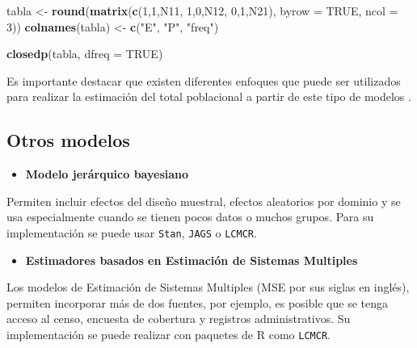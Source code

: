 \documentclass[
  12pt,
]{book}
\newenvironment{Shaded}{\begin{snugshade}}{\end{snugshade}}
\newcommand{\AttributeTok}[1]{\textcolor[rgb]{0.13,0.29,0.53}{#1}}
\newcommand{\ConstantTok}[1]{\textcolor[rgb]{0.56,0.35,0.01}{#1}}
\newcommand{\DecValTok}[1]{\textcolor[rgb]{0.00,0.00,0.81}{#1}}
\newcommand{\FunctionTok}[1]{\textcolor[rgb]{0.13,0.29,0.53}{\textbf{#1}}}
\newcommand{\NormalTok}[1]{#1}
\newcommand{\OtherTok}[1]{\textcolor[rgb]{0.56,0.35,0.01}{#1}}
\newcommand{\StringTok}[1]{\textcolor[rgb]{0.31,0.60,0.02}{#1}}
\providecommand{\tightlist}{%
  \setlength{\itemsep}{0pt}\setlength{\parskip}{0pt}}
\begin{document}
\begin{Shaded}
\begin{Highlighting}[]
\NormalTok{tabla }\OtherTok{\textless{}{-}} \FunctionTok{round}\NormalTok{(}\FunctionTok{matrix}\NormalTok{(}\FunctionTok{c}\NormalTok{(}\DecValTok{1}\NormalTok{,}\DecValTok{1}\NormalTok{,N11,}
                        \DecValTok{1}\NormalTok{,}\DecValTok{0}\NormalTok{,N12,}
                        \DecValTok{0}\NormalTok{,}\DecValTok{1}\NormalTok{,N21), }\AttributeTok{byrow =} \ConstantTok{TRUE}\NormalTok{, }\AttributeTok{ncol =} \DecValTok{3}\NormalTok{))}
\FunctionTok{colnames}\NormalTok{(tabla) }\OtherTok{\textless{}{-}} \FunctionTok{c}\NormalTok{(}\StringTok{"E"}\NormalTok{, }\StringTok{"P"}\NormalTok{, }\StringTok{"freq"}\NormalTok{)}

\FunctionTok{closedp}\NormalTok{(tabla, }\AttributeTok{dfreq =} \ConstantTok{TRUE}\NormalTok{)}
\end{Highlighting}
\end{Shaded}

Es importante destacar que existen diferentes enfoques que puede ser utilizados para realizar la estimación del total poblacional a partir de este tipo de modelos \citep{otis1978statistical, rivest2007applications, baillargeon2007rcapture, rivest2014capture}.

\subsection{Otros modelos}\label{otros-modelos}

\begin{itemize}
\tightlist
\item
  \textbf{Modelo jerárquico bayesiano}
\end{itemize}

Permiten incluir efectos del diseño muestral, efectos aleatorios por dominio y se usa especialmente cuando se tienen pocos datos o muchos grupos. Para su implementación se puede usar \texttt{Stan}, \texttt{JAGS} o \texttt{LCMCR}.

\begin{itemize}
\tightlist
\item
  \textbf{Estimadores basados en Estimación de Sistemas Multiples}
\end{itemize}

Los modelos de Estimación de Sistemas Multiples (MSE por sus siglas en inglés), permiten incorporar más de dos fuentes, por ejemplo, es posible que se tenga acceso al censo, encuesta de cobertura y registros administrativos. Su implementación se puede realizar con paquetes de R como \texttt{LCMCR}.
\end{document}
